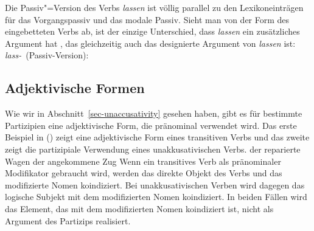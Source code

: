 {%
Die Passiv"=Version des Verbs \emph{lassen} ist völlig parallel
zu den Lexikoneinträgen für das Vorgangspassiv 
und das modale Passiv. Sieht man von der Form des eingebetteten Verbs ab, ist der
einzige Unterschied, dass \emph{lassen} ein zusätzliches Argument hat ,
das gleichzeitig auch das designierte Argument von \emph{lassen} ist:
\eas
\label{le-lassen-passive-da}
\mbox{\emph{lass-} (Passiv-Version):} \\
\ms{
 head$|$da     & \sliste{ \ibox{1} }\\[2mm]
 comps & \sliste{ \ibox{1} NP[\type{str}] } $\oplus$ \ibox{2} $\oplus$ \liste{ V[\type{bse}, \textsc{lex}+, \textsc{da}~\sliste{ NP$_{\type{ref}}$}, \textsc{comps}~\ibox{2}]}\\[2mm]
}
\zs




\subsection{Adjektivische Formen}
\label{sec-adj-formation}


Wie wir in Abschnitt~\ref{sec-unaccusativity} gesehen haben, gibt
es für bestimmte Partizipien eine adjektivische Form, die
pränominal verwendet wird. Das erste Beispiel in () zeigt eine
adjektivische Form eines transitiven Verbs und das zweite
zeigt die partizipiale Verwendung eines unakkusativischen Verbs.
\eal
\ex{}\label{ex-der-reparierte-wagen}
der reparierte Wagen
\ex{}\label{ex-angekommene}
der angekommene Zug
\zl
Wenn ein transitives Verb als pränominaler Modifikator gebraucht wird,
werden das direkte Objekt des Verbs und das modifizierte Nomen koindiziert.
Bei unakkusativischen Verben wird dagegen das logische Subjekt mit dem modifizierten Nomen koindiziert.
In beiden Fällen wird das Element, das mit dem modifizierten Nomen koindiziert ist,
nicht als Argument des Partizips realisiert.

}
